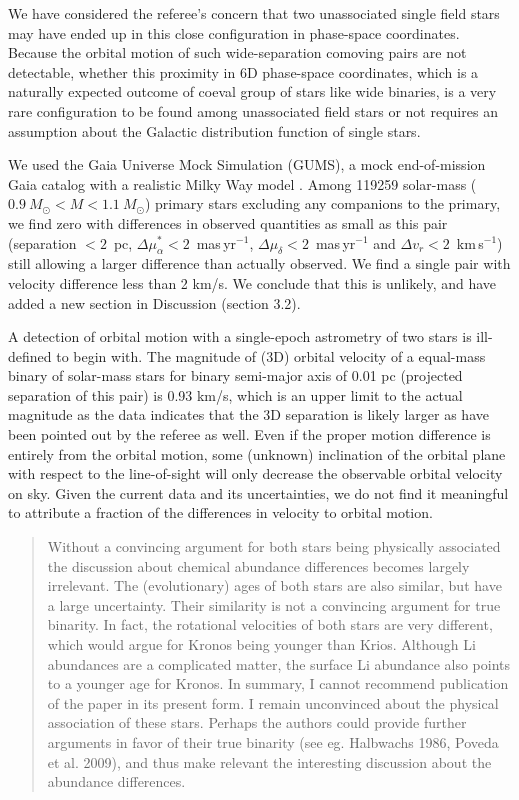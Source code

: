 \documentclass[12pt]{article}
\begin{document}
We have considered the referee's concern that two unassociated
single field stars may have ended up in this close configuration in
phase-space coordinates. Because the orbital motion of such
wide-separation comoving pairs are not detectable, whether this
proximity in 6D phase-space coordinates, which is a naturally expected
outcome of coeval group of stars like wide binaries, is a very rare
configuration to be found among unassociated field stars or not
requires an assumption about the Galactic distribution
function of single stars.

We used the Gaia Universe Mock Simulation (GUMS), a mock
end-of-mission Gaia catalog with a realistic Milky Way model \citep{gums}.
Among 119259 solar-mass ($0.9~M_\odot< M < 1.1~M_\odot$) primary stars excluding
any companions to the primary, we find zero with differences in observed
quantities as small as this pair
(separation $<2$~pc,
$\Delta \mu_\alpha^* < 2$~mas\,yr$^{-1}$,
$\Delta \mu_\delta<2$~mas\,yr$^{-1}$ and
$\Delta v_r < 2$~km\,s$^{-1}$) still
allowing a larger difference than actually observed.
We find a single pair with velocity difference less than 2 km/s.
We conclude that this is unlikely, and 
have added a new section in Discussion (section 3.2).

A detection of orbital motion with a single-epoch astrometry of two
stars is ill-defined to begin with.
The magnitude of (3D) orbital velocity of a equal-mass binary of solar-mass
stars for binary semi-major axis of 0.01 pc (projected separation of this pair)
is 0.93 km/s,
which is an upper limit to the actual magnitude as the data
indicates that the 3D separation is likely larger as have been pointed
out by the referee as well.
Even if the proper motion difference is entirely from the orbital motion, some
(unknown) inclination of the orbital plane with respect to the line-of-sight
will only decrease the observable orbital velocity on sky.
Given the current data and its uncertainties, we do not find it meaningful to
attribute a fraction of the differences in velocity to orbital motion.


\begin{quote}
Without a convincing argument for both stars being physically associated
the discussion about chemical abundance differences becomes largely
irrelevant.
The (evolutionary) ages of both stars are also similar, but have a large
uncertainty. Their similarity is not a convincing argument for true binarity.
In fact, the rotational velocities of both stars are very different,
which would argue for Kronos being younger than Krios. Although Li
abundances are a complicated matter, the surface Li abundance also
points to a younger age for Kronos. 
In summary, I cannot recommend
publication of the paper in its present form. I remain unconvinced about
the physical association of these stars. Perhaps the authors could
provide further arguments in favor of their true binarity (see eg.
Halbwachs 1986, Poveda et al. 2009), and thus make relevant the
interesting discussion about the abundance differences.
\end{quote}
\end{document}
